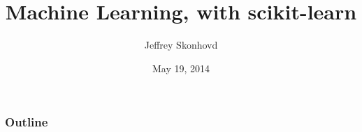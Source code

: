 \documentclass[t]{beamer}
\title{Machine Learning, with scikit-learn}
\author{Jeffrey Skonhovd}
\institute{Georgia Institute of Technology}
\date{May 19, 2014}
\begin{document}
\begin{frame}
\titlepage
\end{frame}

\begin{frame}
\frametitle{Outline}
\tableofcontents
\end{frame}


\end{document}
